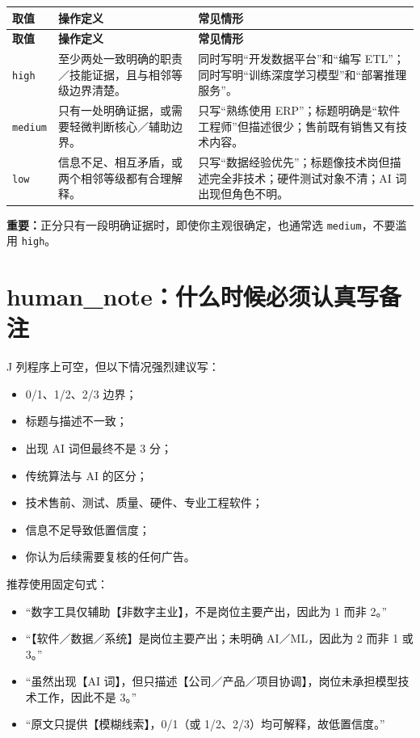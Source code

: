 \documentclass[11pt,a4paper,fontset=none]{ctexart}
\begin{document}
\begin{longtable}{L{2.2cm}L{5.3cm}L{6.6cm}}
\toprule
{}\color{white}\textbf{取值} & \color{white}\textbf{操作定义} & \color{white}\textbf{常见情形}\\
\midrule
\endfirsthead
\toprule
{}\color{white}\textbf{取值} & \color{white}\textbf{操作定义} & \color{white}\textbf{常见情形}\\
\midrule
\endhead
\texttt{high} & 至少两处一致明确的职责／技能证据，且与相邻等级边界清楚。 & 同时写明“开发数据平台”和“编写 ETL”；同时写明“训练深度学习模型”和“部署推理服务”。\\
\texttt{medium} & 只有一处明确证据，或需要轻微判断核心／辅助边界。 & 只写“熟练使用 ERP”；标题明确是“软件工程师”但描述很少；售前既有销售又有技术内容。\\
\texttt{low} & 信息不足、相互矛盾，或两个相邻等级都有合理解释。 & 只写“数据经验优先”；标题像技术岗但描述完全非技术；硬件测试对象不清；AI 词出现但角色不明。\\
\bottomrule
\end{longtable}

\textbf{重要：}正分只有一段明确证据时，即使你主观很确定，也通常选 \texttt{medium}，不要滥用 \texttt{high}。

\section{human\_note：什么时候必须认真写备注}

J 列程序上可空，但以下情况强烈建议写：

\begin{itemize}
  \item 0/1、1/2、2/3 边界；
  \item 标题与描述不一致；
  \item 出现 AI 词但最终不是 3 分；
  \item 传统算法与 AI 的区分；
  \item 技术售前、测试、质量、硬件、专业工程软件；
  \item 信息不足导致低置信度；
  \item 你认为后续需要复核的任何广告。
\end{itemize}

推荐使用固定句式：

\begin{itemize}
  \item “数字工具仅辅助【非数字主业】，不是岗位主要产出，因此为 1 而非 2。”
  \item “【软件／数据／系统】是岗位主要产出；未明确 AI／ML，因此为 2 而非 1 或 3。”
  \item “虽然出现【AI 词】，但只描述【公司／产品／项目协调】，岗位未承担模型技术工作，因此不是 3。”
  \item “原文只提供【模糊线索】，0/1（或 1/2、2/3）均可解释，故低置信度。”
\end{itemize}
\end{document}
